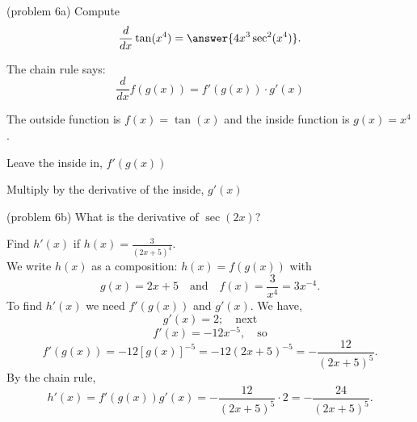 \documentclass[handout]{ximera}
\begin{document}
\begin{problem}(problem 6a)
  Compute
  \[
  \frac{d}{dx} \tan(x^4) = \answer{4x^3 \sec^2(x^4)}.
  \]
  
    \begin{hint}
      The chain rule says:
      \[
      \frac{d}{dx} f(g(x)) = f'(g(x))\cdot g'(x)
      \]
    \end{hint}
    \begin{hint}
      The outside function is $f(x) = \tan(x)$ and the inside
      function is $g(x) = x^4$.
    \end{hint}
    \begin{hint}
		  Leave the inside in, $f'(g(x))$
		\end{hint}
		\begin{hint}
		  Multiply by the derivative of the inside, $g'(x)$
		\end{hint}
 	
\end{problem}

\begin{question}(problem 6b)
What is the derivative of $\sec(2x)$?
\begin{multipleChoice}
\end{multipleChoice}
\end{question}



\begin{example}[example 7]
Find $h'(x)$ if $h(x) = \frac{3}{(2x + 5)^4}$.\\
We write $h(x)$ as a composition: $h(x)=f(g(x))$ with 
\[
g(x) = 2x+ 5  \quad \text{and} \quad  f(x) = \frac{3}{x^4} = 3x^{-4}.
\]
 To find $h'(x)$ we need $f'(g(x))$ and $g'(x)$.  We have,
\[g'(x) = 2; \quad \text{next}\]
\[f'(x) = -12x^{-5}, \quad \text{so}\]
\[f'(g(x)) = -12[g(x)]^{-5} = -12(2x+5)^{-5} = -\frac{12}{(2x+5)^5}.\]
By the chain rule,
\[h'(x) = f'(g(x))g'(x) = -\frac{12}{(2x+5)^5}\cdot 2 = -\frac{24}{(2x+5)^5}.\]
\end{example}

\begin{center}
\begin{foldable}
\end{foldable}
\end{center}
\end{document}
